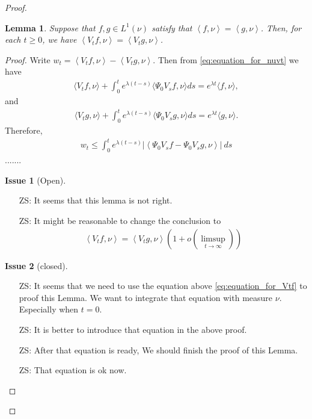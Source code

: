 \documentclass[12pt,a4paper]{amsart}
\numberwithin{equation}{section}
\theoremstyle{plain}
\newtheorem{lem}[thm]{Lemma}
\theoremstyle{definition}
\newtheorem{iss}{Issue}
\begin{document}
\begin{proof}
\begin{lem}
  Suppose that $f,g\in L^1(\nu)$ satisfy that $\left\langle f,\nu \right\rangle = \left\langle g,\nu \right\rangle$. 
Then, for each $t\geq 0$, we have $ \left\langle V_tf,\nu \right\rangle = \left\langle V_tg,\nu \right\rangle $.
\end{lem}
\begin{proof}
  Write $w_t =\left\langle V_tf,\nu \right\rangle - \left\langle V_t g, \nu \right\rangle $. 
  Then from \eqref{eq:equation_for_nuvt} we have
  \begin{align}
    \langle V_tf,\nu\rangle + \int_0^te^{\lambda(t-s)}\langle \Psi_0V_sf,\nu\rangle ds
=e^{\lambda t}\langle f,\nu\rangle,
  \end{align}
and
  \begin{align}
    \langle V_tg,\nu\rangle + \int_0^te^{\lambda(t-s)}\langle \Psi_0V_sg,\nu\rangle ds
    =e^{\lambda t}\langle g,\nu\rangle .
  \end{align}
Therefore, 
\begin{align}
  w_t \leq \int_0^t e^{\lambda (t-s)} \left | \left\langle \Psi_0 V_s f - \Psi_0 V_s g, \nu \right\rangle \right| ~ds 
\end{align}
.......
\begin{iss}[Open]~
  \begin{itemize}
  \item[ZS:]
It seems that this lemma is not right.
\item[ZS:]
It might be reasonable to change the conclusion to 
\begin{align}
  \left\langle V_tf,\nu \right\rangle = \left\langle V_t g,\nu \right\rangle \left( 1+o(\limsup_{t\to \infty}) \right)
\end{align}
  \end{itemize}
\end{iss}
  \begin{iss}[closed]~
    \begin{itemize}
    \item[ZS:]
It seems that we need to use the equation above \eqref{eq:equation_for_Vtf} to proof this Lemma. 
We want to integrate that equation with measure $\nu$. Especially when $t = 0$. 
\item[ZS:]
  It is better to introduce that equation in the above proof.
\item[ZS:]
  After that equation is ready, We should finish the proof of this Lemma.
\item[ZS:]
That equation is ok now.
    \end{itemize}

\end{iss}
\end{proof}
\end{proof}
\end{document}
